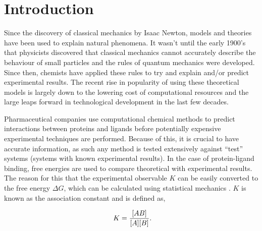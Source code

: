 \chapter{Introduction} \label{Chapter:introduction}


Since the discovery of classical mechanics by Isaac Newton, models and theories have been used to explain natural phenomena.  It wasn't until the early 1900's that physicists discovered that classical mechanics cannot accurately describe the behaviour of small particles and the rules of quantum mechanics were developed.  Since then, chemists have applied these rules to try and explain and/or predict experimental results.  The recent rise in popularity of using these theoretical models is largely down to the lowering cost of computational resources and the large leaps forward in technological development in the last few decades.

Pharmaceutical companies use computational chemical methods to predict interactions between proteins and ligands before potentially expensive experimental techniques are performed.  Because of this, it is crucial to have accurate information, as such any method is tested extensively against ``test'' systems (systems with known experimental results).  In the case of protein-ligand binding, free energies are used to compare theoretical with experimental results.  The reason for this that the experimental observable $K$ can be easily converted to the free energy $\Delta G$, which can be calculated using statistical mechanics \cite{protein-ligand_interactions_book}. $K$ is known as the association constant and is defined as,

\begin{equation}
\ K=\frac{[AB]}{[A][B]} \\.
\end{equation}

